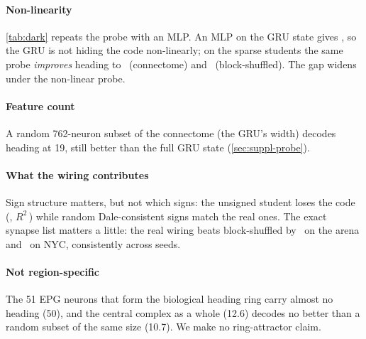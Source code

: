\paragraph{Non-linearity} \cref{tab:dark} repeats the probe with an MLP. An MLP on the GRU state gives
\nGruArenaMlpHd\degree, so the GRU is not hiding the code non-linearly; on the sparse students the same probe
\emph{improves} heading to \nConnArenaMlpHd\degree\ (connectome) and \nBlockArenaMlpHd\degree\ (block-shuffled). The
gap widens under the non-linear probe.

\paragraph{Feature count} A random 762-neuron subset of the connectome (the GRU's width) decodes heading at
19\degree, still better than the full GRU state (\cref{sec:suppl-probe}).

\paragraph{What the wiring contributes} Sign structure matters, but not which signs: the unsigned student loses the
code (\nNosignArenaHd\degree, $R^2$\,\nNosignArenaPos) while random Dale-consistent signs match the real ones. The exact
synapse list matters a little: the real wiring beats block-shuffled by \nConnBlockGapArena\degree\ on the arena and
\nConnBlockGapNyc\degree\ on NYC, consistently across seeds.

\paragraph{Not region-specific} The 51 EPG neurons that form the biological heading ring carry almost no heading
(50\degree), and the central complex as a whole (12.6\degree) decodes no better than a random subset of the same size
(10.7\degree). We make no ring-attractor claim.

\begin{table}[t]
  \centering\small
  \setlength{\tabcolsep}{5pt}
  
  \caption{\textbf{Probe type and dark duration, arena.} Median heading error (\degree) and position $R^2$ under a
  ridge and an MLP probe over 8 dark steps, and under the ridge probe over 16 and 20 dark steps. The real wiring's
  margin over block-shuffled grows from \nConnBlockGapArena\degree\ to \nConnBlockGapArenaDarkSixteen\degree\ at 16 dark steps.}
  \label{tab:dark}
\end{table}

